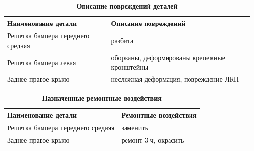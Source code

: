 		

{\small \begin{table}[]
\begin{longtable}{@{}ll@{}}
	\caption[]{\footnotesize {\textbf{Описание повреждений деталей}}} \label{tab:4}\\ 
		\toprule
	\textbf{	Наименование детали       }               &\textbf{ Описание повреждений}                         \\ \midrule
		Решетка бампера переднего средняя        & разбита                                      \\
		Решетка бампера левая                    & оборваны, деформированы крепежные кронштейны \\
		Заднее правое крыло                      & несложная деформация, повреждение ЛКП        \\ \bottomrule
	\end{longtable}
\end{table}}


{\small \begin{table}
	\begin{longtable}{@{}ll@{}}
	\caption[]{\footnotesize {\textbf{Назначенные ремонтные воздействия}}} \label{tab:2}\\ 
	\toprule
\textbf{Наименование детали}                      & \textbf{Ремонтные воздействия}\\ \midrule
Решетка бампера переднего средняя        & заменить             \\
Заднее правое крыло                      & ремонт 3 ч, окрасить \\ \bottomrule
\end{longtable}

\end{table}}


